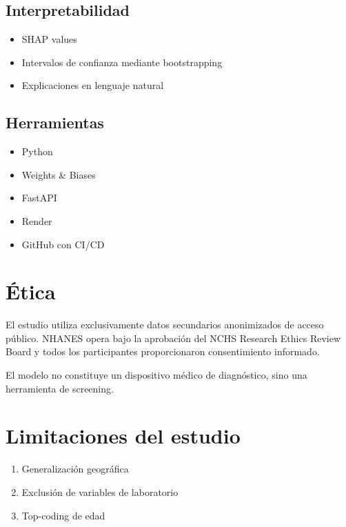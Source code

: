 \documentclass[12pt, a4paper]{report}
\begin{document}
\subsection*{Interpretabilidad}
\begin{itemize}
    \item SHAP values
    \item Intervalos de confianza mediante bootstrapping
    \item Explicaciones en lenguaje natural
\end{itemize}

\subsection*{Herramientas}
\begin{itemize}
    \item Python
    \item Weights \& Biases
    \item FastAPI
    \item Render
    \item GitHub con CI/CD
\end{itemize}

\section{Ética}

El estudio utiliza exclusivamente datos secundarios anonimizados de acceso público. NHANES opera bajo la aprobación del NCHS Research Ethics Review Board y todos los participantes proporcionaron consentimiento informado.

El modelo no constituye un dispositivo médico de diagnóstico, sino una herramienta de screening.

\section{Limitaciones del estudio}

\begin{enumerate}
    \item Generalización geográfica
    \item Exclusión de variables de laboratorio
    \item Top-coding de edad
\end{enumerate}


\end{document}
